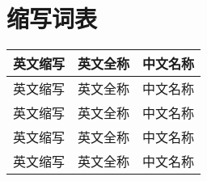 \chapter*{缩写词表}
\begin{table}[!htbp]
	\centering
	\footnotesize%
	\setlength{\tabcolsep}{12pt}%
	\renewcommand{\arraystretch}{1.2}%
	\begin{tabular}{ccc}
		\toprule[1.5pt]
		英文缩写 &英文全称  &中文名称 \\ \hline
		英文缩写 &英文全称  &中文名称\\
		英文缩写 &英文全称  &中文名称\\
		英文缩写 &英文全称  &中文名称\\
		英文缩写 &英文全称  &中文名称\\
		\bottomrule [1.5pt]
		
	\end{tabular}
	\label{tab:cibiao}
\end{table}
